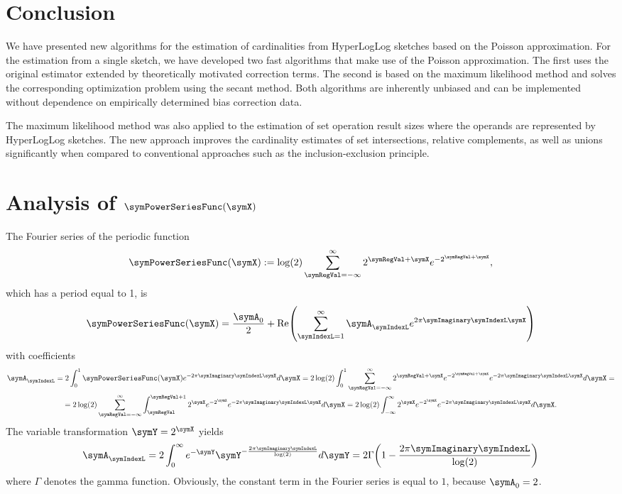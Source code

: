 \documentclass[a4paper]{scrartcl}
\renewcommand\Re{\operatorname{Re}}
\begin{document}
\section{Conclusion}
We have presented new algorithms for the estimation of cardinalities from HyperLogLog sketches based on the Poisson approximation. For the estimation from a single sketch, we have developed two fast algorithms that make use of the Poisson approximation. The first uses the original estimator extended by theoretically motivated correction terms. The second is based on the maximum likelihood method and solves the corresponding optimization problem using the secant method. Both algorithms are inherently unbiased and can be implemented without dependence on empirically determined bias correction data.

The maximum likelihood method was also applied to the estimation of set operation result sizes where the operands are represented by HyperLogLog sketches. The new approach improves the cardinality estimates of set intersections, relative complements, as well as unions significantly when compared to conventional approaches such as the inclusion-exclusion principle.
\appendix

\section{Analysis of $\symPowerSeriesFunc(\symX)$}
\label{app:analysis_xi}
The Fourier series of the periodic function
\begin{equation}
\label{equ:def_xi}
\symPowerSeriesFunc(\symX):= \log(2) \sum_{\symRegVal = -\infty}^\infty
2^{\symRegVal+\symX}
e^{-2^{\symRegVal+\symX}},
\end{equation}
which has a period equal to 1, is
\begin{equation}
\symPowerSeriesFunc(\symX) = \frac{\symA_0}{2} + \Re\!\left(\sum_{\symIndexL=1}^{\infty}
\symA_\symIndexL e^{2\pi\symImaginary\symIndexL\symX}\right)
\end{equation}
with coefficients
\begin{multline}
\symA_\symIndexL = 2\int_0^1 \symPowerSeriesFunc(\symX) e^{-2\pi\symImaginary\symIndexL\symX}d\symX
=
2\log(2)
\int_0^1
\sum_{\symRegVal = -\infty}^\infty
2^{\symRegVal+\symX}
e^{-2^{\symRegVal+\symX}}
e^{-2\pi\symImaginary\symIndexL\symX}
d\symX
=
\\
=
2\log(2)
\sum_{\symRegVal = -\infty}^\infty
\int_{\symRegVal}^{\symRegVal+1}
2^{\symX}
e^{-2^{\symX}}
e^{-2\pi\symImaginary\symIndexL\symX}
d\symX
=
2\log(2) \int_{-\infty}^{\infty} 2^\symX
e^{-2^\symX}
e^{-2\pi\symImaginary\symIndexL\symX}d\symX.
\end{multline}
The variable transformation $\symY = 2^\symX$ yields
\begin{equation}
\symA_\symIndexL
=
2\int_{0}^{\infty} e^{-\symY}
\symY^{-\frac{2\pi\symImaginary\symIndexL}{\log(2)}}d\symY
= 
2\Gamma\!\left(1-\frac{2\pi\symImaginary\symIndexL}{\log(2)}\right)
\end{equation}
where $\Gamma$ denotes the gamma function. Obviously, the constant term in the Fourier series is equal to $1$, because $\symA_0=2$. 
\end{document}
